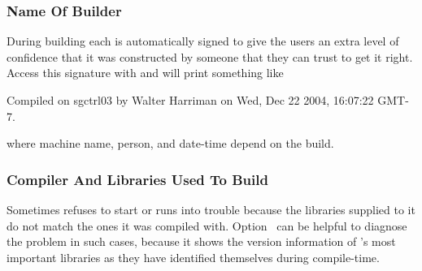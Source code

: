 \begin{table}
  \caption[Image formats and bit-depths]%
          {\label{tab:image-format-and-bit-depth}%
            Bit-depths of selected image formats.  These are the maximum capabilities of the
            formats themselves, not \App's.  The ``Mask''-column indicates whether the format
            supports an image mask (alpha-channel), see also
            \chapterName~\ref{sec:understanding-masks}.  Column~``Profile'' shows whether the
            image format allows for -profiles to be included; see also
            \chapterName~\ref{sec:color-spaces}.}
\end{table}


\subsubsection[Builder]{\label{sec:name-of-builder}%
  Name Of Builder}

During building each \appcmd{} is automatically signed to give the users an extra level of
confidence that it was constructed by someone that they can trust to get it right.  Access this
signature with  and \appcmd{} will print something like

\begin{literal}
  Compiled on sgctrl03 by Walter Harriman on Wed, Dec 22 2004, 16:07:22 GMT-7.
\end{literal}

\noindent where machine name, person, and date-time depend on the
build.


\subsubsection[Compiler And Libraries]{\label{sec:compiler-and-libraries}%
  Compiler And Libraries Used To Build}

Sometimes \appcmd{} refuses to start or runs into trouble because the libraries supplied to it
do not match the ones it was compiled with.  Option~ can be helpful to diagnose the problem in such cases, because it shows
the version information of \App's most important libraries as they have identified themselves
during compile-time.

